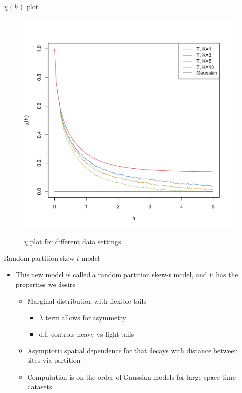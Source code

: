 \documentclass{beamer}
\begin{document}
\begin{frame}{$\chi(h)$ plot}
  \vspace{-2em}
  \centering
  \begin{figure}
  \includegraphics[width=.7\linewidth]{./plots/pot/chi-h.pdf}\\[-0.4in]
  \caption{$\chi$ plot for different data settings}
  \end{figure}
\end{frame}

\begin{frame}{Random partition skew-$t$ model}
  \begin{itemize} \setlength{\itemsep}{0.5em}
    \item This new model is called a random partition skew-$t$ model, and it has the properties we desire
    \begin{itemize}
      \item Marginal distribution with flexible tails
      \begin{itemize}
        \item $\lambda$ term allows for asymmetry
        \item d.f. controls heavy vs light tails
      \end{itemize}
      \item Asymptotic spatial dependence for that decays with distance between sites via partition
      \item Computation is on the order of Gaussian models for large space-time datasets
    \end{itemize}
  \end{itemize}
\end{frame}
\end{document}
